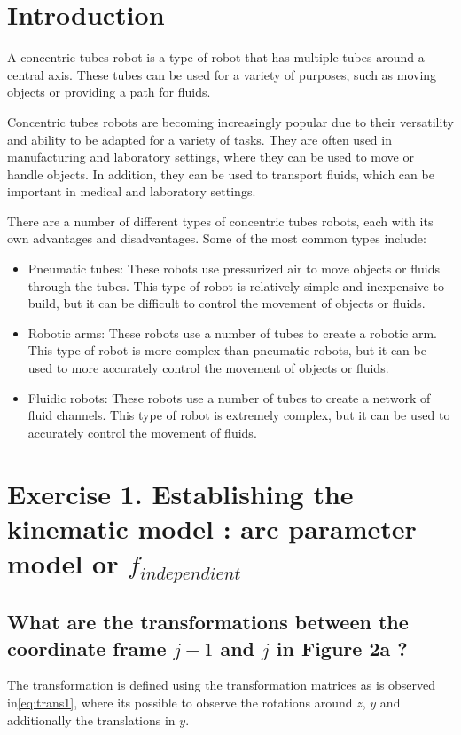 \documentclass[12pt, twoside]{report}
\begin{document}
\section{Introduction}
A concentric tubes robot is a type of robot that has multiple tubes around a central axis. These tubes can be used for a variety of purposes, such as moving objects or providing a path for fluids.

Concentric tubes robots are becoming increasingly popular due to their versatility and ability to be adapted for a variety of tasks. They are often used in manufacturing and laboratory settings, where they can be used to move or handle objects. In addition, they can be used to transport fluids, which can be important in medical and laboratory settings.

There are a number of different types of concentric tubes robots, each with its own advantages and disadvantages. Some of the most common types include:
\begin{itemize}
    \item Pneumatic tubes: These robots use pressurized air to move objects or fluids through the tubes. This type of robot is relatively simple and inexpensive to build, but it can be difficult to control the movement of objects or fluids.
    \item Robotic arms: These robots use a number of tubes to create a robotic arm. This type of robot is more complex than pneumatic robots, but it can be used to more accurately control the movement of objects or fluids.
    \item Fluidic robots: These robots use a number of tubes to create a network of fluid channels. This type of robot is extremely complex, but it can be used to accurately control the movement of fluids.
\end{itemize}

\section{Exercise 1. Establishing the kinematic model : arc parameter model or $f_{independient}$}
\subsection{What are the transformations between the coordinate frame $j-1$ and $j$ in Figure 2a  ?}
The transformation is defined using the transformation matrices as is observed in\ref{eq:trans1}, where its possible to observe the rotations around $z$, $y$ and additionally the translations in $y$.
\end{document}
